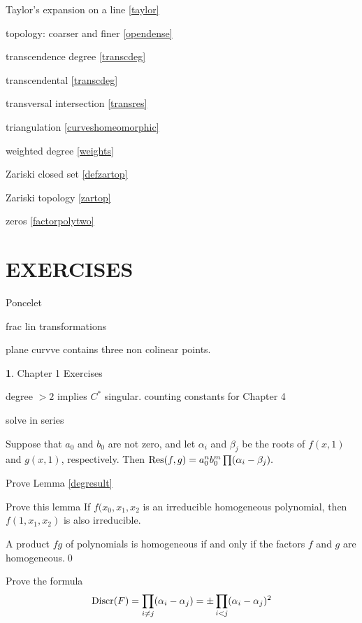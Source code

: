 \documentclass[leqno]{book}
\newcommand\Marginnote[1]{\marginnote{\hspace{-12pt}\normalfont{#1}}}
\theoremstyle{definition}%
\numberwithin{equation}{section}
\newtheorem{thm}[equation]{}
\theoremstyle{theorem} %
\begin{document}
\no
Taylor's expansion on a line \ref{taylor}

\no
topology:  coarser and finer \ref{opendense}

\no
transcendence degree \ref{transcdeg}

\no
transcendental  \ref{transcdeg}

\no
transversal intersection \ref{transres}

\no
triangulation \ref{curveshomeomorphic}

\no
weighted degree \ref{weights}

\no
Zariski closed set \ref{defzartop}

\no
Zariski topology  \ref{zartop}

\no
zeros \ref{factorpolytwo}


\newpage
\section{\bf EXERCISES}

\bs Poncelet

\bs
frac lin transformations

\bs
plane curvve contains three non colinear points.

\bs
\begin{thm}Chapter 1 Exercises
\end{thm}
\Marginnote{exerchapone}\label{exerchapone}

\bs
degree $>2$ implies $C^*$ singular.
\bs
counting constants for Chapter 4
\bs


solve in series

\bs

 Suppose that $a_0$ and $b_0$ are not zero, and let
$\alpha_i$ and $\beta_j$ be the roots of $f(x,1)$ and $g(x,1)$,
respectively.  Then
$\operatorname{Res}(f,g) = a_0^nb_0^m \prod(\alpha_i-\beta_j).$

\bs

Prove Lemma \ref{degresult}

\bs

Prove this lemma
If $f(x_0,x_1,x_2$ is an irreducible homogeneous polynomial, then
$f(1,x_1,x_2)$ is also irreducible.

\bs

A product $fg$ of polynomials 
is homogeneous if and only if the factors $f$ and $g$ are
homogeneous.\qed


\bs

Prove the formula 
$$\operatorname{Discr}(F) = \prod_{i\neq j} (\alpha_i-\alpha_j)= \pm \prod_{i<j}
(\alpha_i-\alpha_j)^2
$$
\end{document}
